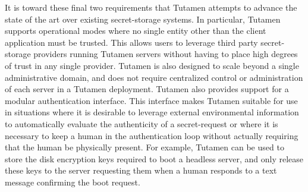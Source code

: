It is toward these final two requirements that Tutamen attempts to
advance the state of the art over existing secret-storage systems. In
particular, Tutamen supports operational modes where no single entity
other than the client application must be trusted. This allows users
to leverage third party secret-storage providers running Tutamen
servers without having to place high degrees of trust in any single
provider. Tutamen is also designed to scale beyond a single
administrative domain, and does not require centralized control or
administration of each server in a Tutamen deployment. Tutamen also
provides support for a modular authentication interface. This
interface makes Tutamen suitable for use in situations where it is
desirable to leverage external environmental information to
automatically evaluate the authenticity of a secret-request or where
it is necessary to keep a human in the authentication loop without
actually requiring that the human be physically present. For example,
Tutamen can be used to store the disk encryption keys required to boot
a headless server, and only release these keys to the server
requesting them when a human responds to a text message confirming the
boot request.

